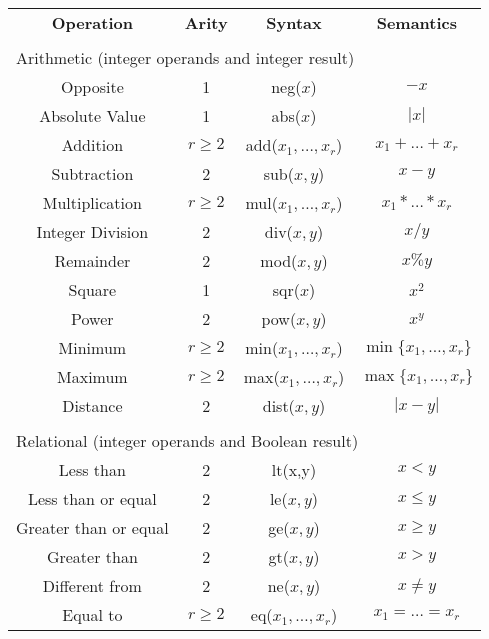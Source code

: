 \documentclass[10pt]{article}
\begin{document}
\begin{table}[h!]
\begin{center}
{\footnotesize
\begin{tabular}{cccc} 
\rowcolor{v2lgray}{} {\textcolor{dred}{\bf Operation}} &  {\textcolor{dred}{\bf Arity}} &  {\textcolor{dred}{\bf Syntax}} &  {\textcolor{dred}{\bf Semantics}} \\
\multicolumn{2}{c}{ } \\
\multicolumn{4}{l}{\textcolor{dred}{Arithmetic (integer operands and integer result)}} \\
\midrule
Opposite  & 1 & neg($x$) & $-x$ \\
Absolute Value &  1 & abs($x$) & $| x |$ \\
Addition    & $r \geq 2$ & add($x_1,\ldots,x_r$) & $x_1 + \ldots + x_r$ \\
Subtraction & 2 & sub($x,y$) & $x - y$ \\
Multiplication & $r \geq 2$ & mul($x_1,\ldots,x_r$) & $x_1 * \ldots * x_r$ \\
Integer Division & 2 & div($x,y$) & $x / y$ \\
Remainder  & 2 & mod($x,y$) & $x \% y$ \\ 
Square  & 1 & sqr($x$) & $x^2$ \\
Power  & 2 & pow($x,y$) & $x^{y}$ \\
Minimum & $r \geq 2$ & min($x_1,\ldots,x_r$) & $\min \{x_1,\ldots,x_r\}$ \\
Maximum & $r \geq 2$ & max($x_1,\ldots,x_r$) & $\max \{x_1,\ldots,x_r\}$ \\
Distance  & 2 & dist($x,y$) & $| x - y |$ \\
\midrule
\multicolumn{2}{c}{ } \\
\multicolumn{4}{l}{\textcolor{dred}{Relational (integer operands and Boolean result)}} \\
\midrule
Less than     & 2 & lt(x,y) & $x < y$ \\
Less than or equal     & 2 & le($x,y$) & $x \leq y$ \\
Greater than or equal     & 2 & ge($x,y$) & $x \geq y$ \\
Greater than     & 2 & gt($x,y$) & $x > y$ \\
Different from    & 2 &  ne($x,y$) & $x \neq y$ \\
Equal to    & $r \geq 2$ & eq($x_1,\ldots,x_r$) & $x_1 = \ldots = x_r$ \\

\end{tabular}}
\end{center}
\end{table}
\end{document}
